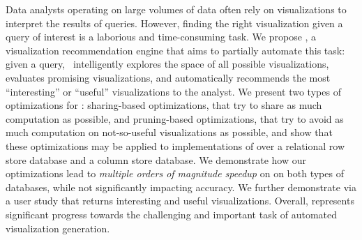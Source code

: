 

Data analysts operating on large volumes of data often rely on visualizations to
interpret the results of queries.
However, finding the right visualization given a query of interest is a
laborious and time-consuming task.
We propose \SeeDB, a visualization recommendation 
engine that aims to partially automate this task:
given a query, \SeeDB\ intelligently explores the space of all possible
visualizations, evaluates promising visualizations, and automatically recommends
the most ``interesting'' or ``useful'' visualizations to the analyst.
We present two types of optimizations for \SeeDB: sharing-based optimizations,
that try to share as much computation as possible,
and pruning-based optimizations, that try to avoid as much computation
on not-so-useful visualizations as possible,
and show that these optimizations may be applied to implementations of \SeeDB over
a relational row store database and  a column store database.
We demonstrate how our optimizations lead to {\em multiple
orders of magnitude speedup} on \SeeDB on both types of databases,
while not significantly impacting accuracy.
We further demonstrate via a user study that \SeeDB returns
interesting and useful visualizations. 
Overall, \SeeDB represents significant progress 
 towards the challenging and important task of automated visualization generation.


